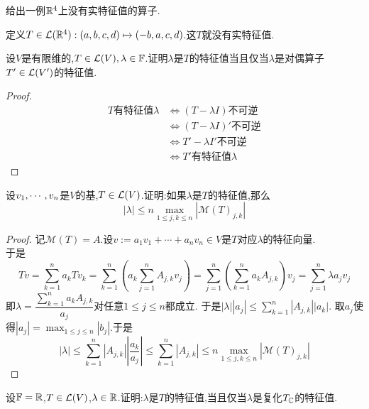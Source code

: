 \documentclass{ctexart}
\begin{document}
\begin{problem}[14.]
    给出一例$\mathbb{R}^4$上没有实特征值的算子.
\end{problem}
\begin{solution}[Solution.]
    定义$T\in\mathcal{L}(\mathbb{R}^4):(a,b,c,d)\mapsto(-b,a,c,d)$.这$T$就没有实特征值.
\end{solution}
\begin{problem}[15.]
    设$V$是有限维的,$T\in\mathcal{L}(V),\lambda\in\mathbb{F}$.证明$\lambda$是$T$的特征值当且仅当$\lambda$是对偶算子$T'\in\mathcal{L}(V')$的特征值.
\end{problem}
\begin{proof}
    $$\begin{aligned}
        T\text{有特征值}\lambda
        &\Leftrightarrow (T-\lambda I)\text{不可逆} \\
        &\Leftrightarrow (T-\lambda I)'\text{不可逆} \\
        &\Leftrightarrow T'-\lambda I'\text{不可逆} \\
        &\Leftrightarrow T'\text{有特征值}\lambda
    \end{aligned}$$
\end{proof}
\begin{problem}[16.]
    设${v}_1,\cdots,{v}_{n}$是$V$的基,$T\in\mathcal{L}(V)$.证明:如果$\lambda$是$T$的特征值,那么
    $$\left|\lambda\right|\leqslant n\max_{1\leqslant j,k\leqslant n}\left|\mathcal{M}(T)_{j,k}\right|$$
\end{problem}
\begin{proof}
    记$\mathcal{M}(T)=A$.设$v:=a_1v_1+\cdots+a_nv_n\in V$是$T$对应$\lambda$的特征向量.\\
    于是$$Tv=\sum_{k=1}^{n}a_kTv_k=\sum_{k=1}^{n}\left(a_k\sum_{j=1}^{n}A_{j,k}v_j\right)=\sum_{j=1}^{n}\left(\sum_{k=1}^{n}a_kA_{j,k}\right)v_j=\sum_{j=1}^{n}\lambda a_jv_j$$
    即$\lambda=\dfrac{\displaystyle\sum_{k=1}^{n}a_kA_{j,k}}{a_j}$对任意$1\leqslant j\leqslant n$都成立.%
    于是$\displaystyle\left|\lambda\right|\left|a_j\right|\leqslant\sum_{k=1}^{n}\left|A_{j,k}\right|\left|a_k\right|$.
    取$a_j$使得$\displaystyle\left|a_j\right|=\max_{1\leqslant j\leqslant n}\left|b_j\right|$.于是
    $$|\lambda|\leqslant\sum_{k=1}^{n}\left|A_{j,k}\right|\left|\dfrac{a_k}{a_j}\right|\leqslant\sum_{k=1}^{n}\left|A_{j,k}\right|\leqslant n\max_{1\leqslant j,k\leqslant n}\left|\mathcal{M}(T)_{j,k}\right|$$
\end{proof}
\begin{problem}[17.]
    设$\mathbb{F}=\mathbb{R}$,$T\in\mathcal{L}(V)$,$\lambda\in\mathbb{R}$.证明:$\lambda$是$T$的特征值,当且仅当$\lambda$是复化$T_{\mathbb{C}}$的特征值.
\end{problem}
\end{document}
